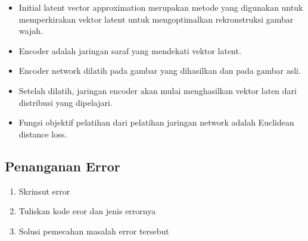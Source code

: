 \begin{enumerate}
\begin{itemize}
        \item Initial latent vector approximation merupakan metode yang digunakan untuk memperkirakan vektor latent untuk mengoptimalkan rekronstruksi gambar wajah.
        \item Encoder adalah jaringan saraf yang mendekati vektor latent.
        \item Encoder network dilatih pada gambar yang dihasilkan dan pada gambar asli.
        \item Setelah dilatih, jaringan encoder akan mulai menghasilkan vektor laten dari distribusi yang dipelajari.
        \item Fungsi objektif pelatihan dari pelatihan jaringan network adalah Euclidean distance loss.
    \end{itemize}
\end{enumerate}

\subsection{Penanganan Error}
\begin{enumerate}
	\item Skrinsut error
    \item Tuliskan kode eror dan jenis errornya
    \item Solusi pemecahan masalah error tersebut
\end{enumerate}